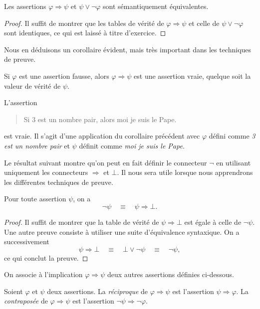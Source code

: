 \documentclass[french,course,oneside,theoremnosection]{lecture}
\newcommand{\iimplies}{\Rightarrow}
\begin{document}
\begin{proposition}
Les assertions $\varphi \iimplies \psi$ et $\psi \vee \neg \varphi$ sont sémantiquement équivalentes.
\end{proposition}
\begin{proof}
Il suffit de montrer que les tables de vérité de $\varphi \iimplies \psi$ et celle de $\psi \vee \neg \varphi$ sont identiques, ce qui est laissé à titre d'exercice.
\end{proof}

Nous en déduisons un corollaire évident, mais très important dans les techniques de preuve.
\begin{corollary}
Si $\varphi$ est une assertion fausse, alors $\varphi \iimplies \psi$ est une assertion vraie, quelque soit la valeur de vérité de $\psi$.
\end{corollary}
\begin{example}
L'assertion 
\begin{quote}
Si $3$ est un nombre pair, alors moi je suis le Pape.
\end{quote}
est vraie. Il s'agit d'une application du corollaire précédent avec $\varphi$ défini comme \emph{3 est un nombre pair} et $\psi$ définit comme \emph{moi je suis le Pape}.
\end{example}

Le résultat suivant montre qu'on peut en fait définir le connecteur $\neg$ en utilisant uniquement les connecteurs $\iimplies$ et $\bot$. Il nous sera utile lorsque nous apprendrons les différentes techniques de preuve.

\begin{proposition}
Pour toute assertion $\psi$, on a 
\[\neg \psi \quad \equiv \quad \psi \iimplies \bot.\]
\end{proposition}
\begin{proof}
Il suffit de montrer que la table de vérité de $\psi \iimplies \bot$ est égale à celle de $\neg \psi$. Une autre preuve consiste à utiliser une suite d'équivalence syntaxique. On a successivement
\[
\psi \iimplies \bot \quad \equiv \quad \bot \vee \neg \psi \quad \equiv \quad \neg \psi,  
\]
ce qui conclut la preuve.
\end{proof}

On associe à l'implication $\varphi \iimplies \psi$ deux autres assertions définies ci-dessous.

\begin{definition}
Soient $\varphi$ et $\psi$ deux assertions. La \emph{réciproque} de $\varphi \iimplies \psi$ est l'assertion $\psi \iimplies \varphi$. La \emph{contraposée} de $\varphi \iimplies \psi$ est l'assertion $\neg \psi \iimplies \neg \varphi$.
\end{definition}
\end{document}
